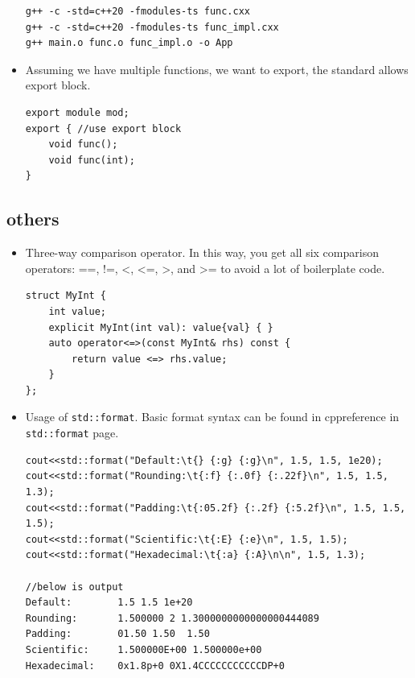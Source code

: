 \documentclass[a4paper,11pt,twoside]{book}
\begin{document}
\begin{itemize}
\begin{lstlisting}
g++ -c -std=c++20 -fmodules-ts func.cxx
g++ -c -std=c++20 -fmodules-ts func_impl.cxx 
g++ main.o func.o func_impl.o -o App
\end{lstlisting}

    \item Assuming we have multiple functions, we want to export, the standard allows export block.

\begin{lstlisting}
export module mod;
export { //use export block
    void func();
    void func(int);
}
\end{lstlisting}

	
\end{itemize}



\subsection{others}

\begin{itemize}
	
	\item Three-way comparison operator. In this way, you get all six comparison operators: ==, !=, <, <=, >, and >= to avoid a lot of boilerplate code.
	
	
\begin{lstlisting}
struct MyInt {
    int value;
    explicit MyInt(int val): value{val} { }
    auto operator<=>(const MyInt& rhs) const {  
        return value <=> rhs.value;
    }
};
\end{lstlisting}	

    \item Usage of \texttt{std::format}. Basic format syntax can be found in cppreference in \texttt{std::format} page.
\begin{lstlisting}[]
cout<<std::format("Default:\t{} {:g} {:g}\n", 1.5, 1.5, 1e20);
cout<<std::format("Rounding:\t{:f} {:.0f} {:.22f}\n", 1.5, 1.5, 1.3);
cout<<std::format("Padding:\t{:05.2f} {:.2f} {:5.2f}\n", 1.5, 1.5, 1.5);
cout<<std::format("Scientific:\t{:E} {:e}\n", 1.5, 1.5);
cout<<std::format("Hexadecimal:\t{:a} {:A}\n\n", 1.5, 1.3);

//below is output
Default:        1.5 1.5 1e+20
Rounding:       1.500000 2 1.3000000000000000444089
Padding:        01.50 1.50  1.50
Scientific:     1.500000E+00 1.500000e+00
Hexadecimal:    0x1.8p+0 0X1.4CCCCCCCCCCCDP+0
\end{lstlisting}

\end{itemize}
\end{document}
